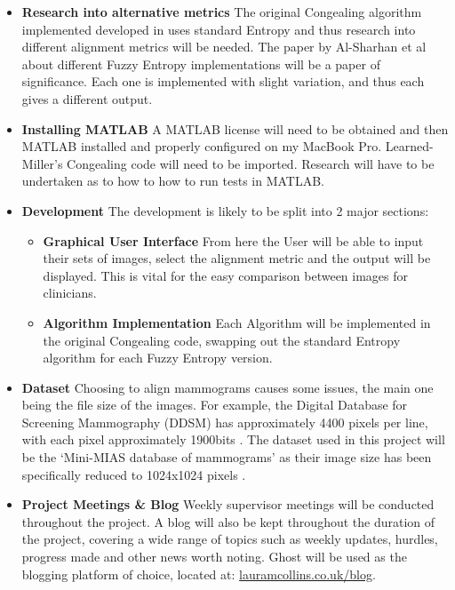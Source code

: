 \documentclass[11pt,fleqn,twoside]{article}
\begin{document}
\begin{itemize}
  \label{itm:task}
  \item\textbf{Research into alternative metrics} The original Congealing algorithm implemented developed in \cite{joint-alignment} uses standard Entropy and thus research into different alignment metrics will be needed. The paper by Al-Sharhan et al \cite{fuzzy-entropy} about different Fuzzy Entropy implementations will be a paper of significance. Each one is implemented with slight variation, and thus each gives a different output.
  \item\textbf{Installing MATLAB} A MATLAB license will need to be obtained and then MATLAB installed and properly configured on my MacBook Pro. Learned-Miller's Congealing code will need to be imported. Research will have to be undertaken as to how to how to run tests in MATLAB.
  \item\textbf{Development} The development is likely to be split into 2 major sections:
  \begin{itemize}
    \item\textbf{Graphical User Interface} From here the User will be able to input their sets of images, select the alignment metric and the output will be displayed. This is vital for the easy comparison between images for clinicians.
    \item\textbf{Algorithm Implementation} Each Algorithm will be implemented in the original Congealing code, swapping out the standard Entropy algorithm for each Fuzzy Entropy version.
  \end{itemize}
  \item\textbf{Dataset} Choosing to align mammograms causes some issues, the main one being the file size of the images. For example, the Digital Database for Screening Mammography (DDSM) has approximately 4400 pixels per line, with each pixel approximately 1900bits \cite{ddsm-paper}. The dataset used in this project will be the `Mini-MIAS database of mammograms' as their image size has been specifically reduced to 1024x1024 pixels \cite{suckling1994mammographic}.
  \item\textbf{Project Meetings \& Blog} Weekly supervisor meetings will be conducted throughout the project. A blog will also be kept throughout the duration of the project, covering a wide range of topics such as weekly updates, hurdles, progress made and other news worth noting. Ghost will be used as the blogging platform of choice, located at: \url{lauramcollins.co.uk/blog}.
\end{itemize}
\end{document}

